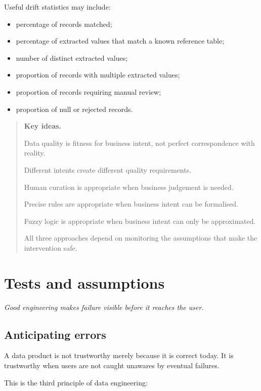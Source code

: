 \documentclass[10pt,openany,10pt]{book}
\providecommand{\tightlist}{%
  \setlength{\itemsep}{0pt}\setlength{\parskip}{0pt}}
\begin{document}
Useful drift statistics may include:

\begin{itemize}
\tightlist
\item
  percentage of records matched;
\item
  percentage of extracted values that match a known reference table;
\item
  number of distinct extracted values;
\item
  proportion of records with multiple extracted values;
\item
  proportion of records requiring manual review;
\item
  proportion of null or rejected records.
\end{itemize}

\begin{quote}
\textbf{Key ideas.}

Data quality is fitness for business intent, not perfect correspondence
with reality.

Different intents create different quality requirements.

Human curation is appropriate when business judgement is needed.

Precise rules are appropriate when business intent can be formalised.

Fuzzy logic is appropriate when business intent can only be
approximated.

All three approaches depend on monitoring the assumptions that make the
intervention safe.
\end{quote}

\newpage

\chapter{Tests and
assumptions}\label{docs-quality-reliability-tests-and-assumptions}

\emph{Good engineering makes failure visible before it reaches the
user.}

\section{Anticipating errors}\label{anticipating-errors}

A data product is not trustworthy merely because it is correct today. It
is trustworthy when users are not caught unawares by eventual failures.

This is the third principle of data engineering:
\end{document}
